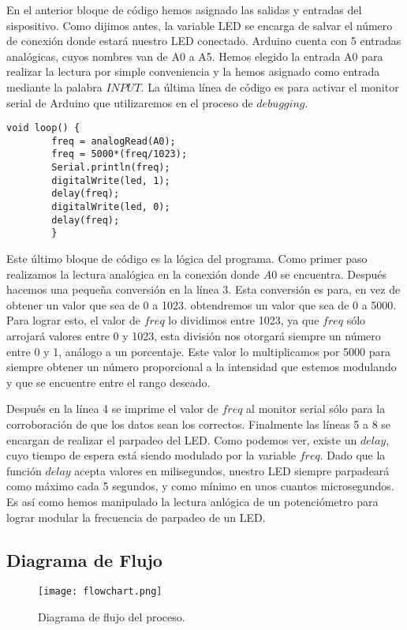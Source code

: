 \documentclass[12pt, letterpaper]{article}
\begin{document}
En el anterior bloque de código hemos asignado las salidas y entradas del sispositivo. Como dijimos antes, la variable LED se encarga de salvar el número de conexión donde estará nuestro LED conectado. Arduino cuenta con 5 entradas analógicas, cuyos nombres van de A0 a A5. Hemos elegido la entrada A0 para realizar la lectura por simple conveniencia y la hemos asignado como entrada mediante la palabra $INPUT$. La última línea de código es para activar el monitor serial de Arduino que utilizaremos en el proceso de $debugging$.

\begin{lstlisting}[language=Arduino]
	void loop() {
		freq = analogRead(A0);
		freq = 5000*(freq/1023);
		Serial.println(freq);
		digitalWrite(led, 1);
		delay(freq);
		digitalWrite(led, 0);
		delay(freq);
		}
\end{lstlisting}

Este último bloque de código es la lógica del programa. Como primer paso realizamos la lectura analógica en la conexión donde $A0$ se encuentra. Después hacemos una pequeña conversión en la línea 3. Esta conversión es para, en vez de obtener un valor que sea de 0 a 1023. obtendremos un valor que sea de 0 a 5000. Para lograr esto, el valor de $freq$ lo dividimos entre 1023, ya que $freq$ sólo arrojará valores entre 0 y 1023, esta división nos otorgará siempre un número entre 0 y 1, análogo a un porcentaje. Este valor lo multiplicamos por 5000 para siempre obtener un número proporcional a la intensidad que estemos modulando y que se encuentre entre el rango deseado.

Después en la línea 4 se imprime el valor de $freq$ al monitor serial sólo para la corroboración de que los datos sean los correctos. Finalmente las líneas 5 a 8 se encargan de realizar el parpadeo del LED. Como podemos ver, existe un $delay$, cuyo tiempo de espera está siendo modulado por la variable $freq$. Dado que la función $delay$ acepta valores en milisegundos, nuestro LED siempre parpadeará como máximo cada 5 segundos, y como mínimo en unos cuantos microsegundos. Es así como hemos manipulado la lectura anlógica de un potenciómetro para lograr modular la frecuencia de parpadeo de un LED.

\subsection*{Diagrama de Flujo}
\begin{figure}[H]
	\centering
	\texttt{[image: flowchart.png]}
	\caption{Diagrama de flujo del proceso.}
\end{figure}
\end{document}
